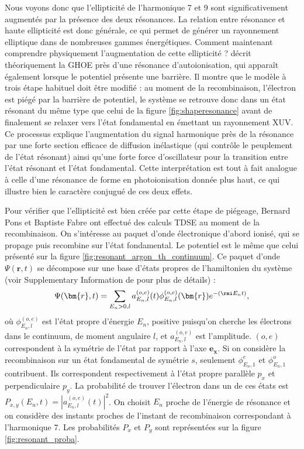 Nous voyons donc que l'ellipticité de l'harmonique 7 et 9 sont significativement augmentés par la présence des deux résonances. La relation entre résonance et haute ellipticité est donc générale, ce qui permet de générer un rayonnement elliptique dans de nombreuses gammes énergétiques. Comment maintenant comprendre physiquement l'augmentation de cette ellipticité ?  décrit théoriquement la GHOE près d'une résonance d'autoionisation, qui apparaît également lorsque le potentiel présente une barrière. Il montre que le modèle à trois étape habituel doit être modifié : au moment de la recombinaison, l'électron est piégé par la barrière de potentiel, le système se retrouve donc dans un état résonant du même type que celui de la figure \ref{fig:shaperesonance} avant de finalement se relaxer vers l'état fondamental en émettant un rayonnement XUV. Ce processus explique l'augmentation du signal harmonique près de la résonance par une forte section efficace de diffusion inélastique (qui contrôle le peuplement de l'état résonant) ainsi qu'une forte force d'oscillateur pour la transition entre l'état résonant et l'état fondamental.
Cette interprétation est tout à fait analogue à celle d'une résonance de forme en photoionisation donnée plus haut, ce qui illustre bien le caractère conjugué de ces deux effets.

Pour vérifier que l'ellipticité est bien créée par cette étape de piégeage, Bernard Pons et Baptiste Fabre ont effectué des calculs TDSE au moment de la recombinaison. On s'intéresse au paquet d'onde électronique d'abord ionisé, qui se propage puis recombine sur l'état fondamental. Le potentiel est le même que celui présenté sur la figure \ref{fig:resonant_argon_th_continuum}. Ce paquet d'onde $\Psi(\bm{r},t)$ se décompose sur une base d'états propres de l'hamiltonien du système (voir Supplementary Information de  pour plus de détails) :
\[ \Psi(\bm{r},t)=\sum_{E_n>0,l} a_{E_n,l}^{(o,e)}(t)\phi_{E_n,l}^{(o,e)}(\bm{r})e^{-(\rmi E_n t)},\]
où $\phi_{E_n,l}^{(o,e)}$ est l'état propre d'énergie $E_n$, positive puisqu'on cherche les électrons dans le continuum, de moment angulaire $l$, et $a_{E_n,l}^{(o,e)}$ est l'amplitude. $(o,e)$ correspondent à la symétrie de l'état par rapport à l'axe $\bm{e_x}$. Si on considère la recombinaison sur un état fondamental de symétrie $s$, seulement $\phi_{E_n,1}^{e}$ et $\phi_{E_n,1}^{o}$ contribuent. Ils correspondent respectivement à l'état propre parallèle $p_x$ et perpendiculaire $p_y$. La probabilité de trouver l'électron dans un de ces états est $P_{x,y}(E_n,t) = |a_{E_n,l}^{(o,e)}(t)|^2$. On choisit $E_n$ proche de l'énergie de résonance et on considère des instants proches de l'instant de recombinaison correspondant à l'harmonique 7. Les probabilités $P_x$ et $P_y$ sont représentées sur la figure \ref{fig:resonant_proba}.

